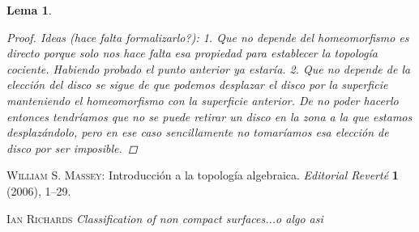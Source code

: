 \documentclass[a4paper,11pt,spanish, twoside, leqno]{tfg-uam}
\newtheorem{lema}[teor]{Lema}
\theoremstyle{definition}
\begin{document}
\begin{lema}
\begin{enumerate}
\begin{proof}
			Ideas (hace falta formalizarlo?):
			1. Que no depende del homeomorfismo es directo porque solo nos hace falta esa propiedad para establecer la topología cociente. Habiendo probado el punto anterior ya estaría.
			2. Que no depende de la elección del disco se sigue de que podemos desplazar el disco por la superficie manteniendo el homeomorfismo con la superficie anterior. De no poder hacerlo entonces tendríamos que no se puede retirar un disco en la zona a la que estamos desplazándolo, pero en ese caso sencillamente no tomaríamos esa elección de disco por ser imposible.
		\end{proof}
	\end{enumerate} 
\end{lema}

\begin{thebibliography}{10}

    \textsc{William S. Massey}: 
    Introducción a la topología algebraica. 
    \textit{Editorial Reverté} {\bf1} (2006), 1--29.

    \textsc{Ian Richards}
    \textit{Classification of non compact surfaces...o algo asi}
    
    
\end{thebibliography}
\cleardoublepage
\end{document}
